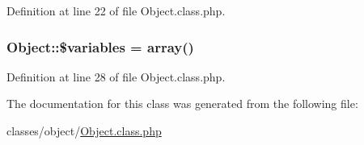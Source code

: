 Definition at line 22 of file Object.\+class.\+php.

\hypertarget{classObject_a153e76f6619408780cc2b50cef5100c6}{
\subsubsection[{\$variables}]{\setlength{\rightskip}{0pt plus 5cm}Object\+::\$variables = array()}}\label{classObject_a153e76f6619408780cc2b50cef5100c6}


Definition at line 28 of file Object.\+class.\+php.



The documentation for this class was generated from the following file\+:\begin{DoxyCompactItemize}
\item 
classes/object/\hyperlink{Object_8class_8php}{Object.\+class.\+php}\end{DoxyCompactItemize}
